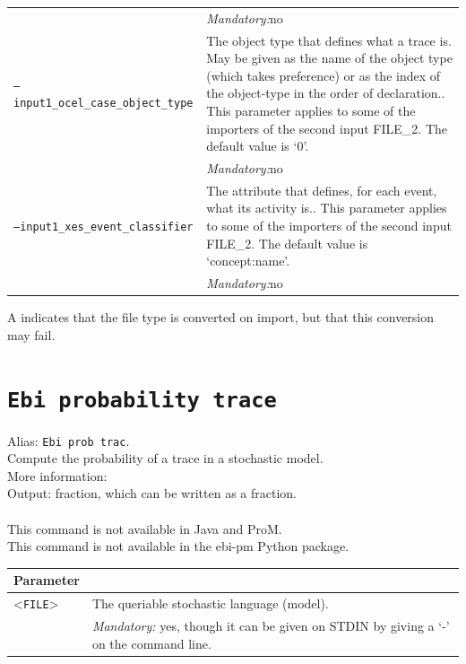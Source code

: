 {\begin{tabularx}{\linewidth}{lX}
&\textit{Mandatory:}\quad no\\
\texttt{--input1\_ocel\_case\_object\_type} & The object type that defines what a trace is. May be given as the name of the object type (which takes preference) or as the index of the object-type in the order of declaration.. This parameter applies to some of the importers of the second input FILE\_2. The default value is `0'.\\
&\textit{Mandatory:}\quad no\\
\texttt{--input1\_xes\_event\_classifier} & The attribute that defines, for each event, what its activity is.. This parameter applies to some of the importers of the second input FILE\_2. The default value is `concept:name'.\\
&\textit{Mandatory:}\quad no\\
\bottomrule
\end{tabularx}
A \textdagger{} indicates that the file type is converted on import, but that this conversion may fail.
\clearpage\section{\texttt{Ebi probability trace}}
\label{command:Ebi probability trace}
Alias: \texttt{Ebi prob trac}.\\
Compute the probability of a trace in a stochastic model.\\
More information: ~\cite{DBLP:journals/is/LeemansMM24}~\\
\noindent Output: fraction, which can be written as a fraction.\\
\\This command is not available in Java and ProM.
\\This command is not available in the ebi-pm Python package.
\begin{tabularx}{\linewidth}{lX}
\toprule
Parameter \\\midrule
<\texttt{FILE}>&The queriable stochastic language (model).\\
&\textit{Mandatory:} \quad yes, though it can be given on STDIN by giving a `-' on the command line.\\

\end{tabularx}}
